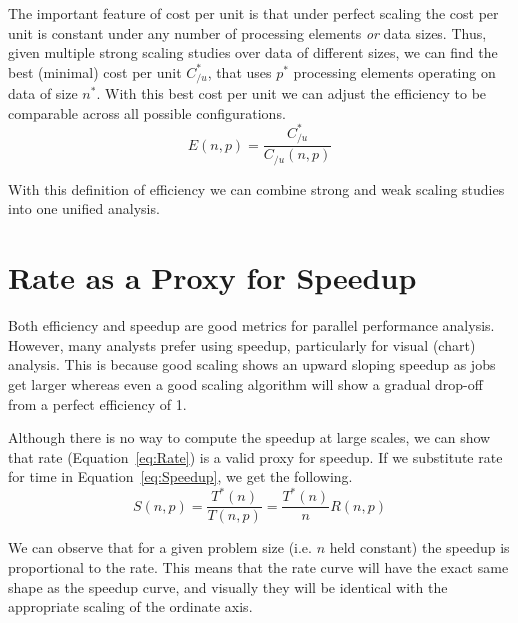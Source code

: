 \documentclass{llncs}
\begin{document}
The important feature of cost per unit is that under perfect scaling the
cost per unit is constant under any number of processing elements \emph{or}
data sizes. Thus, given multiple strong scaling studies over data of
different sizes, we can find the best (minimal) cost per unit $C_{/u}^*$,
that uses $p^*$ processing elements operating on data of size $n^*$.
With this best
cost per unit we can adjust the efficiency to be comparable across all
possible configurations.
\begin{equation}
  E(n,p) = \frac{C_{/u}^*}{C_{/u}(n,p)}
  \label{eq:EfficiencyCostPerUnit}
\end{equation}

With this definition of efficiency we can combine strong and weak scaling
studies into one unified analysis.

\section{Rate as a Proxy for Speedup}
\label{sec:RateProxy}

\noindent
Both efficiency and speedup are good metrics for parallel performance
analysis. However, many analysts prefer using speedup, particularly for
visual (chart) analysis. This is because good scaling shows an upward
sloping speedup as jobs get larger whereas even a good scaling algorithm
will show a gradual drop-off from a perfect efficiency of 1.

Although there is no way to compute the speedup at large scales, we can
show that rate (Equation~\ref{eq:Rate}) is a valid proxy for speedup. If we
substitute rate for time in Equation~\ref{eq:Speedup}, we get the
following.
\begin{equation}
  S(n,p) = \frac{T^*(n)}{T(n,p)} = \frac{T^*(n)}{n} R(n,p)
  \label{eq:SpeedupFromRate}
\end{equation}

We can observe that for a given problem size (i.e. $n$ held constant) the
speedup is proportional to the rate. This means that the rate curve will
have the exact same shape as the speedup curve, and visually they will be
identical with the appropriate scaling of the ordinate axis.
\end{document}

